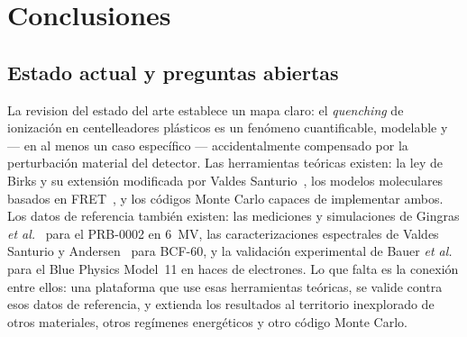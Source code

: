 \documentclass[11pt,a4paper]{article}
\begin{document}

\section{Conclusiones}

\subsection*{Estado actual y preguntas abiertas}



La revision del estado del arte establece un mapa claro: el \textit{quenching} de ionización en centelleadores plásticos es un fenómeno cuantificable, modelable y --- en al menos un caso específico --- accidentalmente compensado por la perturbación material del detector. Las herramientas teóricas existen: la ley de Birks y su extensión modificada por Valdes Santurio~\cite{santurio2020}, los modelos moleculares basados en FRET~\cite{ogawa2018}, y los códigos Monte Carlo capaces de implementar ambos. Los datos de referencia también existen: las mediciones y simulaciones de Gingras \textit{et al.}~\cite{gingras2025} para el PRB-0002 en 6~MV, las caracterizaciones espectrales de Valdes Santurio y Andersen~\cite{santurio2019} para BCF-60, y la validación experimental de Bauer \textit{et al.}~\cite{bauer2026} para el Blue Physics Model~11 en haces de electrones. Lo que falta es la conexión entre ellos: una plataforma que use esas herramientas teóricas, se valide contra esos datos de referencia, y extienda los resultados al territorio inexplorado de otros materiales, otros regímenes energéticos y otro código Monte Carlo.

\end{document}
